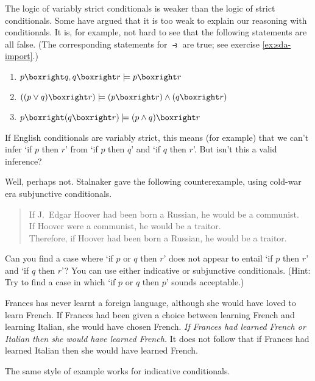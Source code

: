 The logic of variably strict conditionals is weaker than the logic of strict
conditionals. Some have argued that it is too weak to explain our
reasoning with conditionals. It is, for example, not hard to see that the
following statements are all false. (The corresponding statements for
$\strictif$ are true; see exercise \ref{ex:sda-import}.)
\begin{enumerate}[leftmargin=10mm]
  \itemsep-1mm
\item $p \boxright q, q \boxright r \models p \boxright r$
\item $((p \lor q) \boxright r) \models (p \boxright r) \land (q \boxright r)$
\item $p \boxright (q \boxright r) \models (p \land q) \boxright r$
\end{enumerate}
If English conditionals are variably strict, this means (for example) that we can't 
infer `if $p$ then $r$' from `if $p$ then $q$' and `if $q$ then $r$'. But isn't
this a valid inference?

Well, perhaps not. Stalnaker gave the following counterexample, using cold-war
era subjunctive conditionals.
\begin{quote}
  If J.\ Edgar Hoover had been born a Russian, he would be a communist.\\
  If Hoover were a communist, he would be a traitor.\\
  Therefore, if Hoover had been born a Russian, he would be a traitor.
\end{quote}

\begin{exercise}
  Can you find a case where `if $p$ or $q$ then $r$' does not appear to entail
  `if $p$ then $r$' and `if $q$ then $r$'? You can use either indicative or
  subjunctive conditionals. (Hint: Try to find a case in which `if $p$ or $q$
  then $p$' sounds acceptable.)
\end{exercise}
\begin{solution}
  Frances has never learnt a foreign language, although she would have loved to
  learn French. If Frances had been given a choice between learning French and
  learning Italian, she would have chosen French. \emph{If Frances had learned
    French or Italian then she would have learned French.} It does not follow that
  if Frances had learned Italian then she would have learned French.

  The same style of example works for indicative conditionals.
\end{solution}

